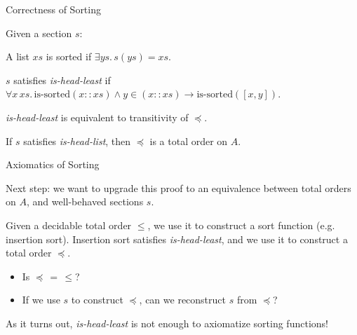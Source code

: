 \documentclass[9pt]{beamer}
\begin{document}
\begin{frame}{Correctness of Sorting}

Given a section $s$:

\begin{dblock}[is-sorted]
    A list $xs$ is sorted if $\exists ys. \, s(ys) = xs$.
\end{dblock}

\begin{dblock}
    $s$ satisfies \textit{is-head-least} if \\
    $\forall x \, xs. \, \text{is-sorted}(x :: xs) \land y \in (x :: xs) \to \text{is-sorted}([x, y])$.
\end{dblock}

\begin{tblock}[Lemma]
    \alert{\textit{is-head-least}} is equivalent to \alert{transitivity} of $\preceq$.
\end{tblock}

\begin{tblock}[Corollary]
    If $s$ satisfies {\textit{is-head-list}}, then $\preceq$ is a total order on $A$.
\end{tblock}

\end{frame}

\begin{frame}{Axiomatics of Sorting}

    Next step: we want to upgrade this proof to an equivalence between total orders on $A$, and well-behaved sections $s$.

    Given a \alert{decidable total order} $\leq$, we use it to construct a sort function (e.g. insertion sort).
    Insertion sort satisfies \textit{is-head-least}, and we use it to construct a total order $\preceq$.

    \begin{pblock}[Question]
        \begin{itemize}
            \item Is $\preceq \, = \, \leq$?
            \item If we use $s$ to construct $\preceq$, can we reconstruct $s$ from $\preceq$?
        \end{itemize}        
    \end{pblock}

    As it turns out, \textit{is-head-least} is \alert{not enough} to axiomatize sorting functions!
\end{frame}
\end{document}

